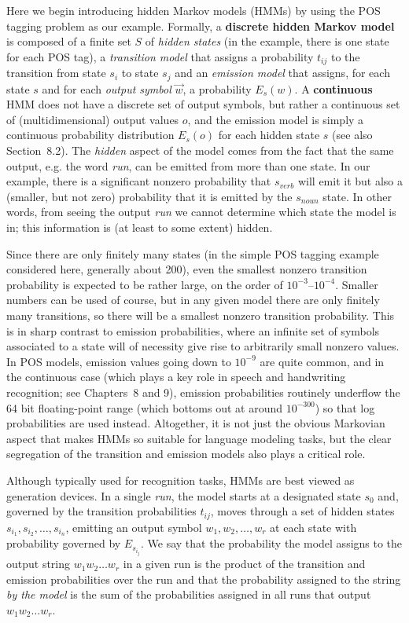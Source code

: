 Here we begin introducing hidden Markov models (HMMs) by using the POS tagging
problem as our example. Formally, a {\bf discrete hidden Markov
  model} is composed of a finite set
$S$ of {\it hidden states} (in the example, there is one state for each POS
tag), a {\it transition model} that assigns a probability $t_{ij}$ to the
transition from state $s_i$ to state $s_j$ and an {\it emission model} that
assigns, for each state $s$ and for each {\it output symbol} $\vec{w}$, a
probability $E_s(w)$. A {\bf continuous} HMM does not have a discrete set of
output symbols, but rather a continuous set of (multidimensional) output
values $o$, and the emission model is simply a continuous probability
distribution $E_s(o)$ for each hidden state $s$ (see also Section~8.2).  The
{\it hidden} aspect of the model comes from the fact that the same output,
e.g. the word {\it run}, can be emitted from more than one state. In our
example, there is a significant nonzero probability that $s_{\textit{verb}}$
will emit it but also a (smaller, but not zero) probability that it is emitted
by the $s_{\textit{noun}}$ state.  In other words, from seeing the output {\it
  run} we cannot determine which state the model is in; this information is
(at least to some extent) hidden.

Since there are only finitely many states (in the simple POS tagging example
considered here, generally about 200), even the smallest nonzero transition
probability is expected to be rather large, on the order of
$10^{-3}$--$10^{-4}$. Smaller numbers can be used of course, but in any given
model there are only finitely many transitions, so there will be a smallest
nonzero transition probability. This is in sharp contrast to emission
probabilities, where an infinite set of symbols associated to a state will of
necessity give rise to arbitrarily small nonzero values. In POS models,
emission values going down to $10^{-9}$ are quite common, and in the
continuous case (which plays a key role in speech and handwriting recognition;
see Chapters~8 and 9), emission probabilities routinely underflow the 64 bit
floating-point range (which bottoms out at around $10^{-300}$) so that log
probabilities are used instead. Altogether, it is not just the obvious
Markovian aspect that makes HMMs so suitable for language modeling tasks, but
the clear segregation of the transition and emission models also plays a
critical role.

Although typically used for recognition tasks, HMMs are best viewed as
generation devices. In a single {\it run},
the model starts at a designated state $s_0$ and, governed by the
transition probabilities $t_{ij}$, moves through a set of hidden states
$s_{i_1}, s_{i_2}, \ldots, s_{i_n}$, emitting an output symbol $w_1, w_2,
\ldots, w_r$ at each state with probability governed by $E_{s_{i_j}}$. We say
that the probability the model assigns to the output string $w_1w_2\ldots w_r$
in a given run is the product of the transition and emission probabilities
over the run and that the probability assigned to the string {\it by the
  model} is the sum of the probabilities assigned in all runs that output
$w_1w_2\ldots w_r$.

